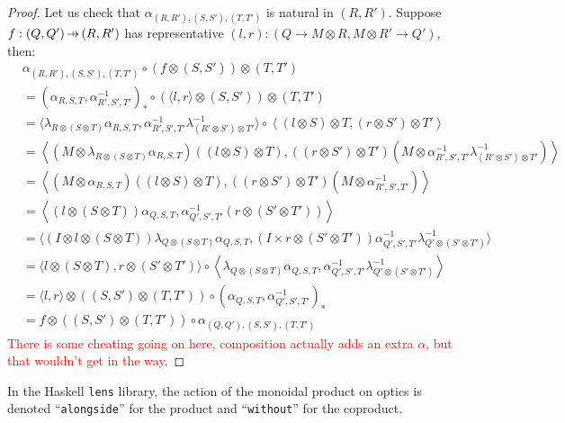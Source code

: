 \documentclass[11pt,a4paper]{article}
\theoremstyle{plain}
\theoremstyle{definition}
\newcommand{\hto}{\ensuremath{\,\mathaccent\shortmid\rightarrow\,}}
\newcommand{\todo}[1]{\textcolor{red}{\small #1}}
\begin{document}
\begin{proof}
Let us check that $\alpha_{(R, R'), (S, S'), (T, T')}$ is natural in $(R, R')$. Suppose $f : (Q, Q') \hto (R, R')$ has representative $(l, r) : (Q \to M \otimes R, M \otimes R' \to Q')$, then:
\begin{align*}
&\alpha_{(R, R'), (S, S'), (T, T')} \circ (f \otimes (S, S')) \otimes (T, T') \\
&= (\alpha_{R,S,T}, \alpha_{R',S',T'}^{-1})_*  \circ (\langle l, r \rangle \otimes (S, S')) \otimes (T, T') \\
&= \langle\lambda_{R \otimes (S \otimes T)}\alpha_{R,S,T}, \alpha_{R',S',T'}^{-1} \lambda^{-1}_{(R' \otimes S') \otimes T'} \rangle  \circ \left\langle (l \otimes S) \otimes T, (r \otimes S') \otimes T' \right\rangle \\
&=\left\langle (M \otimes \lambda_{R \otimes (S \otimes T)}\alpha_{R,S,T})((l \otimes S) \otimes T), ((r \otimes S') \otimes T') (M \otimes \alpha_{R',S',T'}^{-1} \lambda^{-1}_{(R' \otimes S') \otimes T'} ) \right\rangle \\
&=\left\langle (M \otimes \alpha_{R,S,T})((l \otimes S) \otimes T), ((r \otimes S') \otimes T') (M \otimes \alpha_{R',S',T'}^{-1} )\right\rangle \\
&=\left\langle (l \otimes (S \otimes T))\alpha_{Q,S,T}, \alpha_{Q',S',T'}^{-1}(r \otimes (S' \otimes T')) \right\rangle \\
&= \langle (I \otimes l \otimes (S \otimes T)) \lambda_{Q \otimes (S \otimes T)}\alpha_{Q,S,T}, (I \times r \otimes (S' \otimes T')) \alpha_{Q',S',T'}^{-1} \lambda^{-1}_{Q' \otimes (S' \otimes T')}\rangle \\
&= \langle l \otimes (S \otimes T), r \otimes (S' \otimes T')\rangle \circ \left\langle \lambda_{Q \otimes (S \otimes T)}\alpha_{Q,S,T}, \alpha_{Q',S',T'}^{-1} \lambda^{-1}_{Q' \otimes (S' \otimes T')} \right\rangle \\
&= \langle l, r \rangle \otimes ((S, S') \otimes (T, T')) \circ (\alpha_{Q,S,T}, \alpha_{Q',S',T'}^{-1})_* \\
&= f \otimes ((S, S') \otimes (T, T')) \circ \alpha_{(Q, Q'), (S, S'), (T, T')} 
\end{align*}
\todo{There is some cheating going on here, composition actually adds an extra $\alpha$, but that wouldn't get in the way.}
\end{proof}

In the Haskell \texttt{lens} library, the action of the monoidal product on optics is denoted ``\texttt{alongside}'' for the product and ``\texttt{without}'' for the coproduct.
\end{document}
